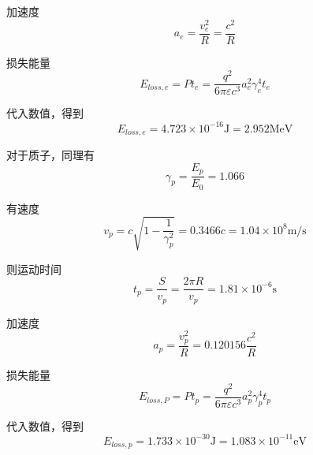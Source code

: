 \documentclass{article}
\begin{document}
加速度$$ a_e = \frac{v_e^2}{R} = \frac{c^2}{R} $$

损失能量 $$ E_{loss, e} = Pt_e = \frac{q^2}{6\pi\varepsilon c^3}a_e^2\gamma_e^4 t_e $$

代入数值，得到 $$ E_{loss, e} = 4.723 \times {10}^{-16} \text{J} = 2.952 \text{MeV} $$

对于质子，同理有$$\gamma_p = \frac{E_p}{E_0} = 1.066 $$

有速度$$ v_p = c \sqrt{1-\frac{1}{\gamma_p^2}} = 0.3466c = 1.04 \times {10}^{8} \text{m/s} $$

则运动时间 $$t_p = \frac{S}{v_p} = \frac{2\pi R}{v_p} = 1.81 \times {10}^{-6} \text{s}$$

加速度$$ a_p = \frac{v_p^2}{R} = 0.120156 \frac{c^2}{R} $$

损失能量 $$ E_{loss, P} = Pt_p = \frac{q^2}{6\pi\varepsilon c^3}a_p^2\gamma_p^4 t_p $$

代入数值，得到 $$ E_{loss, p} = 1.733 \times {10}^{-30} \text{J} = 1.083 \times 10^{-11} \text{eV} $$
\end{document}
